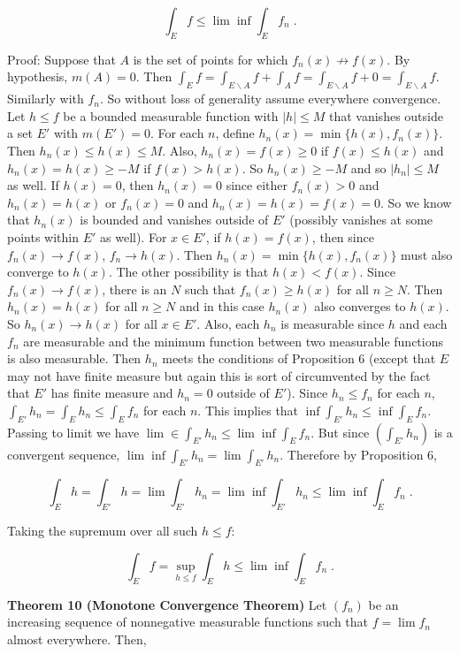 \documentclass[a4paper]{article}
\begin{document}
$$\int_E f \leq \lim \inf \int_E f_n \;.$$

Proof: Suppose that $A$ is the set of points for which $f_n(x) \not\rightarrow f(x)$. By hypothesis, $m(A) = 0$. Then $\int_E f = \int_{E\backslash A} f + \int_{A} f = \int_{E\backslash A} f + 0 = \int_{E\backslash A} f$. Similarly with $f_n$. So without loss of generality assume everywhere convergence. Let $h \leq f$ be a bounded measurable function with $|h| \leq M$ that vanishes outside a set $E'$ with $m(E') = 0$. For each $n$, define $h_n(x) = \min \{h(x), f_n(x)\}$. Then $h_n(x) \leq h(x) \leq M$. Also, $h_n(x) = f(x) \geq 0$ if $f(x) \leq h(x)$ and $h_n(x) = h(x) \geq -M$ if $f(x) > h(x)$. So $h_n(x) \geq -M$ and so $|h_n| \leq M$ as well. If $h(x) = 0$, then $h_n(x) = 0$ since either $f_n(x) > 0$ and $h_n(x) = h(x)$ or $f_n(x) = 0$ and $h_n(x) = h(x) = f(x) = 0$. So we know that $h_n(x)$ is bounded and vanishes outside of $E'$ (possibly vanishes at some points within $E'$ as well). For $x \in E'$, if $h(x) = f(x)$, then since $f_n(x) \rightarrow f(x)$, $f_n \rightarrow h(x)$. Then $h_n(x) = \min \{h(x), f_n(x)\}$ must also converge to $h(x)$. The other possibility is that $h(x) < f(x)$. Since $f_n(x) \rightarrow f(x)$, there is an $N$ such that $f_n(x) \geq h(x)$ for all $n\geq N$. Then $h_n(x) = h(x)$ for all $n\geq N$ and in this case $h_n(x)$ also converges to $h(x)$. So $h_n(x) \rightarrow h(x)$ for all $x \in E'$. Also, each $h_n$ is measurable since $h$ and each $f_n$ are measurable and the minimum function between two measurable functions is also measurable. Then $h_n$ meets the conditions of Proposition 6 (except that $E$ may not have finite measure but again this is sort of circumvented by the fact that $E'$ has finite measure and $h_n = 0$ outside of $E'$). Since $h_n \leq f_n$ for each $n$, $\int_{E'} h_n = \int_E h_n \leq \int_E f_n$ for each $n$. This implies that $\inf \int_{E'} h_n \leq \inf \int_E f_n$. Passing to limit we have $\lim \in \int_{E'} h_n \leq \lim \inf \int_{E} f_n$. But since $(\int_{E'} h_n)$ is a convergent sequence, $\lim \inf \int_{E'} h_n = \lim \int_{E'} h_n$. Therefore by Proposition 6,

$$\int_E h = \int_{E'} h = \lim \int_{E'} h_n = \lim \inf \int_{E'} h_n \leq \lim \inf \int_E f_n \;.$$ 

Taking the supremum over all such $h \leq f$:

$$\int_{E} f = \sup_{h\leq f} \int_{E} h \leq \lim \inf \int_{E} f_n \;.$$

{\bf Theorem 10 (Monotone Convergence Theorem)} Let $(f_n)$ be an increasing sequence of nonnegative measurable functions such that $f = \lim f_n$ almost everywhere. Then,
\end{document}
